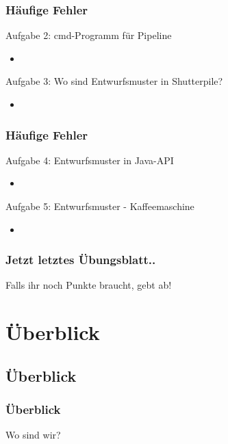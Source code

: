 \documentclass[18pt]{beamer}
\begin{document}
	\begin{frame}
		\frametitle{Häufige Fehler}
		\begin{block}{Aufgabe 2: cmd-Programm für Pipeline}
			\begin{itemize}
				\pause 
				\item %
			\end{itemize}
		\end{block}
		\pause 
		\begin{block}{Aufgabe 3: Wo sind Entwurfsmuster in Shutterpile?}
			\begin{itemize}
				\item %
			\end{itemize}
		\end{block}
	\end{frame}

	\begin{frame}
		\frametitle{Häufige Fehler}
		\begin{block}{Aufgabe 4: Entwurfsmuster in Java-API}
			\begin{itemize}
				\pause
				\item %
			\end{itemize}
		\end{block}
		\pause
		\begin{block}{Aufgabe 5: Entwurfsmuster - Kaffeemaschine}
			\begin{itemize}
				\item %
			\end{itemize}
		\end{block}
	\end{frame}

	\begin{frame}
		\frametitle{Jetzt letztes Übungsblatt..}
		\begin{huge}
			Falls ihr noch Punkte braucht, gebt ab!
		\end{huge}
\end{frame}

\section{Überblick}
	\subsection{Überblick}
	\begin{frame}
		\frametitle{Überblick}
		\centering \huge Wo sind wir?
	\end{frame}
	
\end{document}
